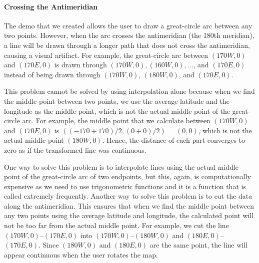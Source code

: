 \paragraph{Crossing the Antimeridian}


The demo that we created allows the user to draw a great-circle arc between any two points. However, when the arc crosses the antimeridian (the 180th meridian), a line will be drawn through a longer path that does not cross the antimeridian, causing a visual artifact. For example, the great-circle arc between $(170W, 0)$ and $(170E, 0)$ is drawn through  $(170W, 0), (160W, 0), \dots$, and $(170E, 0)$ instead of being drawn through $(170W, 0)$, $(180W, 0)$, and $(170E, 0)$.



This problem cannot be solved by using interpolation alone because when we find the middle point between two points, we use the average latitude and the longitude as the middle point, which is not the actual middle point of the great-circle arc. For example, the middle point that we calculate between $(170W, 0)$ and $(170E, 0)$ is $((-170+170)/2,(0+0)/2)$ = $(0, 0)$, which is not the actual middle point $(180W, 0)$. Hence, the distance of each part converges to zero as if the transformed line was continuous.

One way to solve this problem is to interpolate lines using the actual middle point of the great-circle arc of two endpoints, but this, again, is computationally expensive as we need to use trigonometric functions and it is a function that is called extremely frequently. Another way to solve this problem is to cut the data along the antimeridian. This ensures that when we find the middle point between any two points using the average latitude and longitude, the calculated point will not be too far from the actual middle point. For example, we cut the line $(170W, 0)$--$(170E, 0)$ into $(170W, 0)$--$(180W, 0)$  and $(180E, 0)$--$(170E, 0)$. Since $(180W, 0)$ and $(180E, 0)$ are the same point, the line will appear continuous when the user rotates the map.

